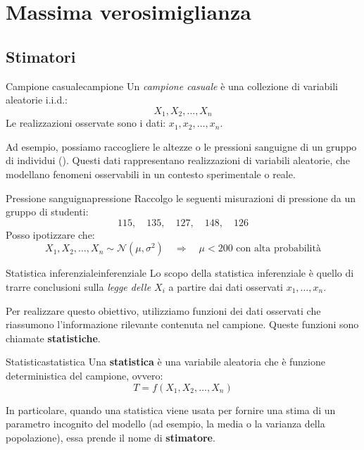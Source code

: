 \section{Massima verosimiglianza}\label{sec:mle}

\subsection{Stimatori}\label{sec:stimatori}

\begin{definizione}{Campione casuale}{campione}
Un \emph{campione casuale} è una collezione di variabili aleatorie i.i.d.:
\[
X_1, X_2, \dots, X_n
\]
Le realizzazioni osservate sono i dati: \( x_1, x_2, \dots, x_n \).
\end{definizione}

Ad esempio, possiamo raccogliere le altezze o le pressioni sanguigne di un gruppo di individui (). Questi dati rappresentano realizzazioni di variabili aleatorie, che modellano fenomeni osservabili in un contesto sperimentale o reale.
\begin{esempio}{Pressione sanguigna}{pressione}
Raccolgo le seguenti misurazioni di pressione da un gruppo di studenti:
\[
115, \quad 135, \quad 127, \quad 148, \quad 126
\]
Posso ipotizzare che:
\[
X_1, X_2, \dots, X_n \sim \mathcal{N}(\mu, \sigma^2)
\quad \Rightarrow \quad \mu < 200 \text{ con alta probabilità}
\]
\end{esempio}

\begin{definizione}{Statistica inferenziale}{inferenziale}
Lo scopo della statistica inferenziale è quello di trarre conclusioni sulla \emph{legge delle \( X_i \)} a partire dai dati osservati \( x_1, \dots, x_n \).
\end{definizione}

Per realizzare questo obiettivo, utilizziamo funzioni dei dati osservati che riassumono l'informazione rilevante contenuta nel campione. Queste funzioni sono chiamate \textbf{statistiche}.

\begin{definizione}{Statistica}{statistica}
Una \textbf{statistica} è una variabile aleatoria che è funzione deterministica del campione, ovvero:
\[
T = f(X_1, X_2, \dots, X_n)
\]
\end{definizione}

In particolare, quando una statistica viene usata per fornire una stima di un parametro incognito del modello (ad esempio, la media o la varianza della popolazione), essa prende il nome di \textbf{stimatore}.

